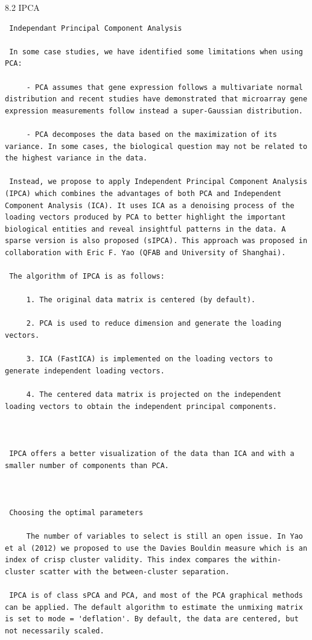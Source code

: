 \documentclass[
]{book}
\begin{document}
\begin{enumerate}
  8.2 IPCA

\begin{verbatim}
 Independant Principal Component Analysis

 In some case studies, we have identified some limitations when using PCA:

     - PCA assumes that gene expression follows a multivariate normal distribution and recent studies have demonstrated that microarray gene expression measurements follow instead a super-Gaussian distribution.

     - PCA decomposes the data based on the maximization of its variance. In some cases, the biological question may not be related to the highest variance in the data.

 Instead, we propose to apply Independent Principal Component Analysis (IPCA) which combines the advantages of both PCA and Independent Component Analysis (ICA). It uses ICA as a denoising process of the loading vectors produced by PCA to better highlight the important biological entities and reveal insightful patterns in the data. A sparse version is also proposed (sIPCA). This approach was proposed in collaboration with Eric F. Yao (QFAB and University of Shanghai).

 The algorithm of IPCA is as follows:

     1. The original data matrix is centered (by default).

     2. PCA is used to reduce dimension and generate the loading vectors.

     3. ICA (FastICA) is implemented on the loading vectors to generate independent loading vectors.

     4. The centered data matrix is projected on the independent loading vectors to obtain the independent principal components.



 IPCA offers a better visualization of the data than ICA and with a smaller number of components than PCA.



 Choosing the optimal parameters

     The number of variables to select is still an open issue. In Yao et al (2012) we proposed to use the Davies Bouldin measure which is an index of crisp cluster validity. This index compares the within-cluster scatter with the between-cluster separation.

 IPCA is of class sPCA and PCA, and most of the PCA graphical methods can be applied. The default algorithm to estimate the unmixing matrix is set to mode = 'deflation'. By default, the data are centered, but not necessarily scaled.


\end{verbatim}
\end{enumerate}
\end{document}
